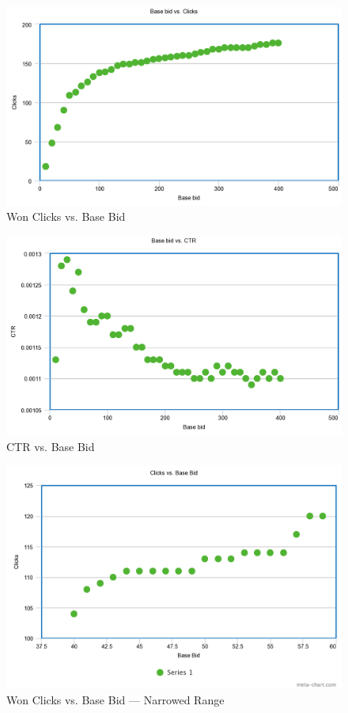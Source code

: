 \documentclass{sig-alternate-05-2015}
\begin{document}
\begin{figure}[h!]
  \includegraphics[width=\linewidth]{linear_clicks.png}
  \caption{Won Clicks vs. Base Bid}
  \label{clicksbb}
\end{figure}

\begin{figure}[h!]
  \includegraphics[width=\linewidth]{linear_CTR.png}
  \caption{CTR vs. Base Bid}
  \label{ctrbb}
\end{figure}

\begin{figure}[h!]
  \includegraphics[width=\linewidth]{linear_clicks_specific.png}
  \caption{Won Clicks vs. Base Bid --- Narrowed Range}
  \label{clicksbbs}
\end{figure}
\end{document}
